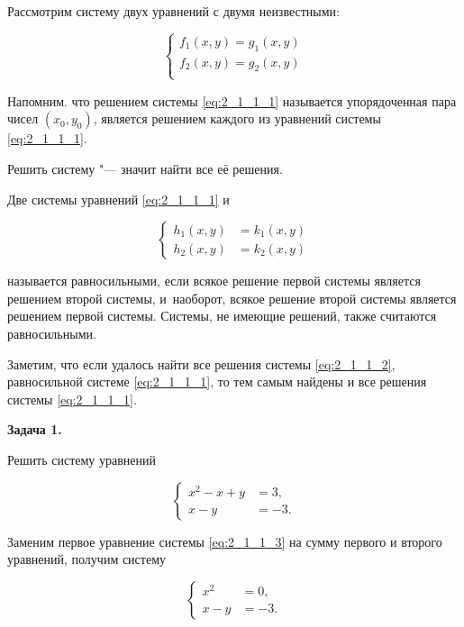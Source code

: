 Рассмотрим систему двух уравнений с двумя неизвестными:

\begin{equation}\label{eq:2_1_1_1}
\begin{cases}
f_{1}(x, y) = g_{1}(x, y) \\
f_{2}(x, y) = g_{2}(x, y) \\
\end{cases}
\end{equation}

Напомним. что решением системы \eqref{eq:2_1_1_1} называется упорядоченная пара
чисел $(x_{0}, y_{0})$, является решением каждого из уравнений системы \eqref{eq:2_1_1_1}.

Решить систему "--- значит найти все её решения.

Две системы уравнений \eqref{eq:2_1_1_1} и

\begin{equation}\label{eq:2_1_1_2}
\begin{cases}
h_{1}(x, y) &= k_{1}(x, y) \\
h_{2}(x, y) &= k_{2}(x, y)
\end{cases}
\end{equation}

называется равносильными, если всякое решение первой системы является решением
второй системы, и~наоборот, всякое решение второй системы является решением
первой системы. Системы, не имеющие решений, также считаются равносильными.

Заметим, что если удалось найти все решения системы \eqref{eq:2_1_1_2},
равносильной системе \eqref{eq:2_1_1_1}, то тем самым найдены и все решения
системы \eqref{eq:2_1_1_1}.

\hypertarget{ex:2_1_1_1}{\textbf{Задача 1.}} Решить систему уравнений

\begin{equation}\label{eq:2_1_1_3}
\begin{cases}
x^{2} - x + y &= 3, \\
        x - y &= -3.
\end{cases}
\end{equation}

Заменим первое уравнение системы \eqref{eq:2_1_1_3} на сумму первого и второго уравнений,
получим систему

\begin{equation}\label{eq:2_1_1_4}
\begin{cases}
x^{2} &= 0, \\
x - y &= -3.
\end{cases}
\end{equation}

